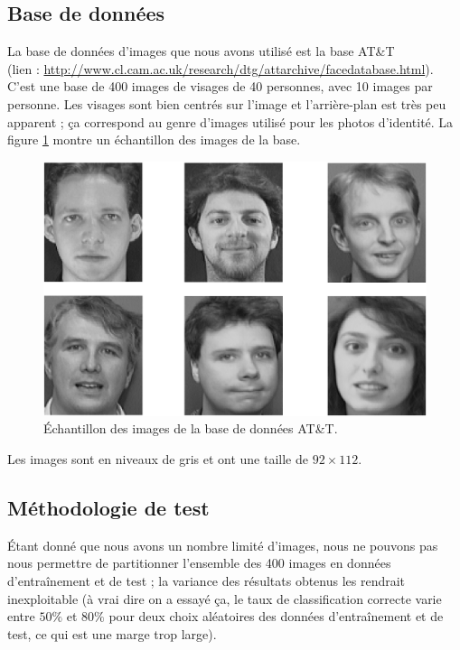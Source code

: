 \subsection{Base de données}
La base de données d'images que nous avons utilisé est la base AT\&T\\
(lien : \url{http://www.cl.cam.ac.uk/research/dtg/attarchive/facedatabase.html}).
C'est une base de 400 images de visages de 40 personnes, avec 10 images 
par personne. Les visages sont bien centrés sur l'image et l'arrière-plan
est très peu apparent ; ça correspond au genre d'images utilisé pour les
photos d'identité. La figure \ref{fig:implementation:bdd_exemple} montre
un échantillon des images de la base.
\begin{figure}[H]
    \centering
    \includegraphics[scale=0.4]{images/bdd_exemple}
    \caption{Échantillon des images de la base de données AT\&T.}
    \label{fig:implementation:bdd_exemple}
\end{figure}
Les images sont en niveaux de gris et ont une taille de $92 \times 112$.


\subsection{Méthodologie de test}
Étant donné que nous avons un nombre limité d'images, nous ne pouvons pas
nous permettre de partitionner l'ensemble des 400 images en données 
d’entraînement et de test ; la variance des résultats obtenus les rendrait
inexploitable (à vrai dire on a essayé ça, le taux de classification correcte
varie entre $50\%$ et $80\%$ pour deux choix aléatoires des données d'entraînement
et de test, ce qui est une marge trop large).

